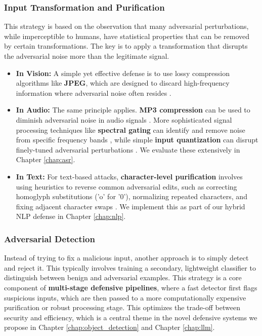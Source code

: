 \documentclass[../main.tex]{subfiles}
\begin{document}
\subsubsection{Input Transformation and Purification}
This strategy is based on the observation that many adversarial perturbations, while imperceptible to humans, have statistical properties that can be removed by certain transformations. The key is to apply a transformation that disrupts the adversarial noise more than the legitimate signal.
\begin{itemize}
    \item \textbf{In Vision:} A simple yet effective defense is to use lossy compression algorithms like \textbf{JPEG}, which are designed to discard high-frequency information where adversarial noise often resides \cite{das2017keepingbadguysout}.
    \item \textbf{In Audio:} The same principle applies. \textbf{MP3 compression} can be used to diminish adversarial noise in audio signals \cite{andronic2020mp3}. More sophisticated signal processing techniques like \textbf{spectral gating} can identify and remove noise from specific frequency bands \cite{oreilly2022voiceblock}, while simple \textbf{input quantization} can disrupt finely-tuned adversarial perturbations \cite{li2024investigating}. We evaluate these extensively in Chapter \ref{chap:asr}.
    \item \textbf{In Text:} For text-based attacks, \textbf{character-level purification} involves using heuristics to reverse common adversarial edits, such as correcting homoglyph substitutions ('o' for '0'), normalizing repeated characters, and fixing adjacent character swaps \cite{morris2020textattack, li2023textpurification}. We implement this as part of our hybrid NLP defense in Chapter \ref{chap:nlp}.
\end{itemize}

\subsubsection{Adversarial Detection}
Instead of trying to fix a malicious input, another approach is to simply detect and reject it. This typically involves training a secondary, lightweight classifier to distinguish between benign and adversarial examples. This strategy is a core component of \textbf{multi-stage defensive pipelines}, where a fast detector first flags suspicious inputs, which are then passed to a more computationally expensive purification or robust processing stage. This optimizes the trade-off between security and efficiency, which is a central theme in the novel defensive systems we propose in Chapter \ref{chap:object_detection} and Chapter \ref{chap:llm}.
\end{document}
